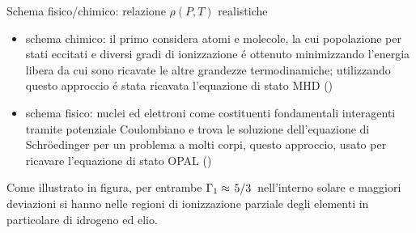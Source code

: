 
\begin{wordonframe}{Schema fisico/chimico: relazione $\rho(P,T)$ realistiche}
\begin{itemize}
\item schema  chimico: il primo considera atomi e molecole, la cui popolazione per stati eccitati e diversi gradi di ionizzazione \'e ottenuto minimizzando l'energia libera da cui sono ricavate le altre grandezze termodinamiche; utilizzando questo approccio \'e stata ricavata l'equazione di stato MHD (\cite{hummer1988equation})
\item schema fisico: nuclei ed elettroni come costituenti fondamentali interagenti tramite potenziale Coulombiano e trova le soluzione dell'equazione di Schr\"oedinger per un problema a molti corpi, questo approccio, usato per ricavare l'equazione di stato OPAL (\cite{rogers1986occupation})
\end{itemize}
Come illustrato in figura, per entrambe $\Gamma_1\approx\left.{5}\middle/{3}\right.$ nell'interno solare e maggiori deviazioni si hanno nelle regioni di ionizzazione parziale degli elementi in particolare di idrogeno ed elio.
\end{wordonframe}

